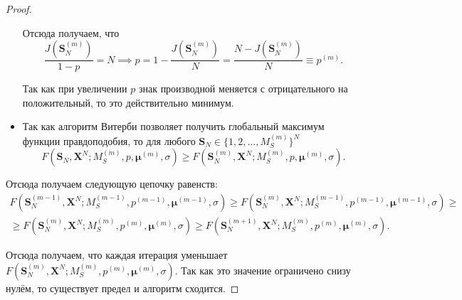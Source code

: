 \begin{proof}
\begin{itemize}
		Отсюда получаем, что
		\[
			\frac{J(\mathbf{S}_{N}^{(m)})}{1 - p} = N \implies p = 1 - 
			\frac{J(\mathbf{S}_{N}^{(m)})}{N} = \frac{N - 
			J(\mathbf{S}_{N}^{(m)})}{N} \equiv p^{(m)}.
		\]
		
		Так как при увеличении \(p\) знак производной меняется с отрицательного 
		на положительный, то это действительно минимум.
		
		\item Так как алгоритм Витерби позволяет получить глобальный максимум 
		функции правдоподобия, то для любого 
		\(\mathbf{S}_{N} \in \{1, 2, \ldots, M_{S}^{(m)}\}^{N}\)
		\[
			F(\mathbf{S}_{N}, \mathbf{X}^{N}; M_{S}^{(m)}, p, 
			\bm{\mu}^{(m)}, \sigma) \geq F(\mathbf{S}_{N}^{(m)}, 
			\mathbf{X}^{N}; M_{S}^{(m)}, p, \bm{\mu}^{(m)}, \sigma).
		\]
	\end{itemize}

	Отсюда получаем следующую цепочку равенств:
	\begin{multline*}
		F(\mathbf{S}_{N}^{(m - 1)}, \mathbf{X}^{N}; M_{S}^{(m - 1)}, p^{(m - 
		1)}, \bm{\mu}^{(m - 1)}, \sigma) \geq F(\mathbf{S}_{N}^{(m)}, 
		\mathbf{X}^{N}; M_{S}^{(m - 1)}, p^{(m - 1)}, \bm{\mu}^{(m - 1)}, 
		\sigma) \geq \\ \geq F(\mathbf{S}_{N}^{(m)}, \mathbf{X}^{N}; 
		M_{S}^{(m)}, p^{(m)}, \bm{\mu}^{(m)}, \sigma) \geq F(\mathbf{S}_{N}^{(m 
		+ 1)}, \mathbf{X}^{N}; M_{S}^{(m)}, p^{(m)}, \bm{\mu}^{(m)}, \sigma).
	\end{multline*}
	
	Отсюда получаем, что каждая итерация уменьшает \(F(\mathbf{S}_{N}^{(m)}, 
	\mathbf{X}^{N}; M_{S}^{(m)}, p^{(m)}, \bm{\mu}^{(m)}, \sigma)\). Так как 
	это значение ограничено снизу нулём, то существует предел и алгоритм 
	сходится.
\end{proof}

